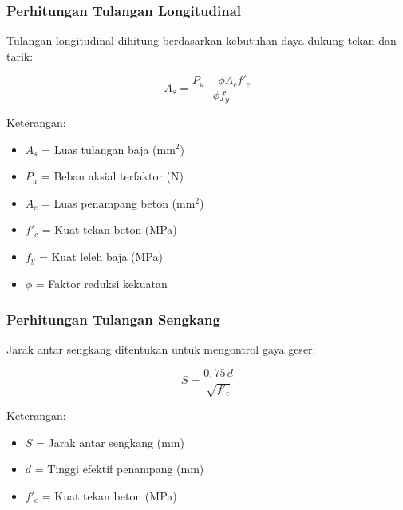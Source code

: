 \documentclass[../main.tex]{subfiles}
\begin{document}
\begin{frame}[c,mycolor=digiPH_gray,mytitle=standard,light]

	\frametitle{Perhitungan Tulangan Longitudinal}
	Tulangan longitudinal dihitung berdasarkan kebutuhan daya dukung tekan dan tarik:

	\begin{equation}
		A_s = \frac{P_u - \phi A_c f'_c}{\phi f_y}
	\end{equation}

	\vspace{0.5cm}

	Keterangan:
	\begin{itemize}
		\item $A_s$ = Luas tulangan baja (mm$^2$)
		\item $P_u$ = Beban aksial terfaktor (N)
		\item $A_c$ = Luas penampang beton (mm$^2$)
		\item $f'_c$ = Kuat tekan beton (MPa)
		\item $f_y$ = Kuat leleh baja (MPa)
		\item $\phi$ = Faktor reduksi kekuatan
	\end{itemize}\end{frame}


\begin{frame}[c,mycolor=digiPH_leaf,mytitle=standard,dark]\frametitle{Perhitungan Tulangan Sengkang}

	Jarak antar sengkang ditentukan untuk mengontrol gaya geser:

	\begin{equation}
		S = \frac{0{,}75\, d}{\sqrt{f'_c}}
	\end{equation}

	\vspace{0.5cm}

	Keterangan:
	\begin{itemize}
		\item $S$ = Jarak antar sengkang (mm)
		\item $d$ = Tinggi efektif penampang (mm)
		\item $f'_c$ = Kuat tekan beton (MPa)
	\end{itemize}
\end{frame}
\end{document}
